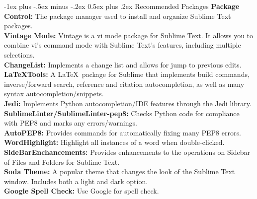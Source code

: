 \documentclass[10pt,landscape]{article}
\makeatletter
\newcommand{\nl}{\\[.3ex]}
\newcommand{\hid}{\hangindent=0.3cm}
\renewcommand{\section}{\@startsection{section}{1}{0mm}%
                                {-1ex plus -.5ex minus -.2ex}%
                                {0.5ex plus .2ex}%
                                {\normalfont\large\bfseries}}
\makeatother
\begin{document}
\begin{multicols*}{3}
\section{Recommended Packages}
\hid
{\bf Package Control:} The package manager used to 
install and organize Sublime Text packages. \nl
\hid
{\bf Vintage Mode:} Vintage is a vi mode package for Sublime Text. It allows 
you to combine vi's command mode with Sublime Text's features, including multiple selections.\nl
\hid
{\bf ChangeList:} Implements a change list and allows for jump to previous edits. \nl
\hid
{\bf LaTeXTools:} A \LaTeX\ package for Sublime that implements build commands, 
inverse/forward search, reference and citation autocompletion, as well as many syntax 
autocompletion/snippets.\nl
\hid
{\bf Jedi:} 
Implements Python autocompletion/IDE features through the Jedi library. 
\nl
\hid
{\bf SublimeLinter/SublimeLinter-pep8:} 
Checks Python code for compliance with PEP8 and marks any errors/warnings. 
\nl
\hid
{\bf AutoPEP8:} 
Provides commands for automatically fixing many PEP8 errors. 
\nl
\hid
{\bf WordHighlight:} 
Highlight all instances of a word when double-clicked. 
\nl
\hid
{\bf SideBarEnchancements:} 
Provides enhancements to the operations on Sidebar of Files and Folders for Sublime Text.
\nl
\hid
{\bf Soda Theme:} 
A popular theme that changes the look of the Sublime Text window. Includes both a light and 
dark option. 
\nl
\hid
{\bf Google Spell Check:} Use Google for spell check.


\end{multicols*}
\end{document}
